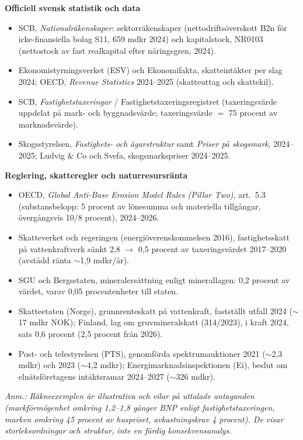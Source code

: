 \documentclass[11pt]{article}
\begin{document}
\textbf{Officiell svensk statistik och data}
\begin{itemize}
\item SCB, \textit{Nationalräkenskaper}: sektorräkenskaper (nettodriftsöverskott B2n för icke-finansiella bolag S11, 659 mdkr 2024) och kapitalstock, NR0103 (nettostock av fast realkapital efter näringsgren, 2024).
\item Ekonomistyrningsverket (ESV) och Ekonomifakta, skatteintäkter per slag 2024; OECD, \textit{Revenue Statistics} 2024--2025 (skatteuttag och skattekil).
\item SCB, \textit{Fastighetstaxeringar} / Fastighetstaxeringsregistret (taxeringsvärde uppdelat på mark- och byggnadsvärde; taxeringsvärde $=$ 75 procent av marknadsvärde).
\item Skogsstyrelsen, \textit{Fastighets- och ägarstruktur} samt \textit{Priser på skogsmark}, 2024--2025; Ludvig \& Co och Svefa, skogsmarkspriser 2024--2025.
\end{itemize}

\textbf{Reglering, skatteregler och naturresursränta}
\begin{itemize}
\item OECD, \textit{Global Anti-Base Erosion Model Rules (Pillar Two)}, art.\ 5.3 (substansbelopp: 5 procent av lönesumma och materiella tillgångar, övergångsvis 10/8 procent), 2024--2026.
\item Skatteverket och regeringen (energiöverenskommelsen 2016), fastighetsskatt på vattenkraftverk sänkt 2,8 $\to$ 0,5 procent av taxeringsvärdet 2017--2020 (avstådd ränta $\sim$1,9 mdkr/år).
\item SGU och Bergsstaten, mineralersättning enligt minerallagen: 0,2 procent av värdet, varav 0,05 procentenheter till staten.
\item Skatteetaten (Norge), grunnrenteskatt på vattenkraft, fastställt utfall 2024 ($\sim$17 mdkr NOK); Finland, lag om gruvmineralskatt (314/2023), i kraft 2024, sats 0,6 procent (2,5 procent från 2026).
\item Post- och telestyrelsen (PTS), genomförda spektrumauktioner 2021 ($\sim$2,3 mdkr) och 2023 ($\sim$4,2 mdkr); Energimarknadsinspektionen (Ei), beslut om elnätsföretagens intäktsramar 2024--2027 ($\sim$326 mdkr).
\end{itemize}

\vspace{1em}
\noindent\textit{\small Anm.: Räkneexemplen är illustrativa och vilar på uttalade antaganden (markförmögenhet omkring 1,2--1,8 gånger BNP enligt fastighetstaxeringen, marken omkring 45 procent av huspriset, avkastningskrav 4 procent). De visar storleksordningar och struktur, inte en färdig konsekvensanalys.}
\end{document}
